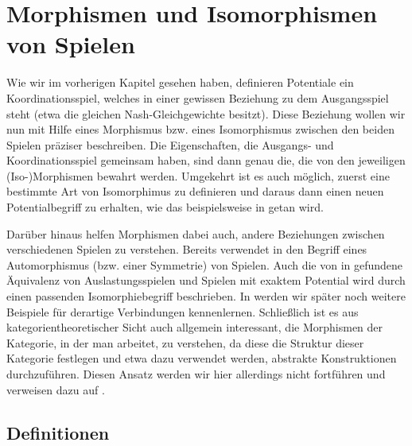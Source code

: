 \section[Morphismen]{Morphismen und Isomorphismen von Spielen}\label{sec:Morphismen}

Wie wir im vorherigen Kapitel gesehen haben, definieren Potentiale ein Koordinationsspiel, welches in einer \glqq gewissen Beziehung\grqq{} zu dem Ausgangsspiel steht (etwa die gleichen Nash-Gleichgewichte besitzt). Diese Beziehung wollen wir nun mit Hilfe eines Morphismus bzw. eines Isomorphismus zwischen den beiden Spielen präziser beschreiben. Die Eigenschaften, die Ausgangs- und Koordinationsspiel gemeinsam haben, sind dann genau die, die von den jeweiligen (Iso-)Morphismen bewahrt werden. Umgekehrt ist es auch möglich, zuerst eine bestimmte Art von Isomorphimus zu definieren und daraus dann einen neuen Potentialbegriff zu erhalten, wie das beispielsweise in \cite[Definitionen 5/6]{BestRespEq} getan wird.

Darüber hinaus helfen Morphismen dabei auch, andere Beziehungen zwischen verschiedenen Spielen zu verstehen. Bereits \citeauthor{Nash} verwendet in \cite[S. 288f]{Nash} den Begriff eines Automorphismus (bzw. einer Symmetrie) von Spielen. Auch die von \citeauthor{MonShap} in \cite[Theorem 3.2]{MonShap} gefundene Äquivalenz von Auslastungsspielen und Spielen mit exaktem Potential wird durch einen passenden Isomorphiebegriff beschrieben. In  werden wir später noch weitere Beispiele für derartige Verbindungen kennenlernen. Schließlich ist es aus kategorientheoretischer Sicht auch allgemein interessant, die Morphismen der Kategorie, in der man arbeitet, zu verstehen, da diese die Struktur dieser Kategorie festlegen und etwa dazu verwendet werden, abstrakte Konstruktionen durchzuführen. Diesen Ansatz werden wir hier allerdings nicht fortführen und verweisen dazu auf \cite{LapGameCat}.

\subsection{Definitionen}

